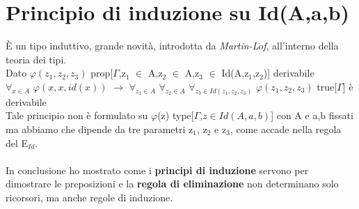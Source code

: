 \section{Principio di induzione su Id(A,a,b)}
\label{sec:principio-di-induzione-Id}
\`E un tipo induttivo, grande novit\`a, introdotta da \textit{Martin-L$\ddot{o}$f}, all'interno della teoria dei tipi.\\
Dato $\varphi(z_1,z_2,z_3)$ prop[$\Gamma$,z$_1$ $\in$ A,z$_2$ $\in$ A,z$_3$ $\in$ Id(A,z$_1$,z$_2$)] derivabile\\
$\forall_{x \in A}$ $\varphi(x,x,id(x))$ $\rightarrow$ $\forall_{z_1 \in A}$ $\forall_{z_2 \in A}$ $\forall_{z_3 \in Id(z_1,z_2,z_3)}$ $\varphi(z_1,z_2,z_3)$ true[$\Gamma$] \`e derivabile\\
Tale principio non \`e formulato su $\varphi$(z) type[$\Gamma$,$z \in Id(A,a,b)$] con A e a,b fissati ma abbiamo che dipende da tre parametri z$_1$, z$_2$ e z$_3$, come accade nella regola del E$_{Id}$.\\\\
\noindent In conclusione  ho mostrato come i \textbf{principi di induzione} servono per dimostrare le preposizioni e la \textbf{regola di eliminazione} non determinano solo ricorsori, ma anche regole di induzione.


